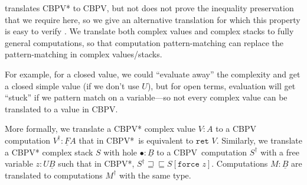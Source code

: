 \documentclass[acmsmall,screen,12pt]{acmart}
\newif\ifshort
\renewcommand{\u}{\underline}
\newcommand{\cbpv}{CBPV}
\newcommand{\cbpvstar}{CBPV*}
\newcommand{\pipe}{\,\,|\,\,}
\newcommand{\ltdyn}{\sqsubseteq}
\newcommand{\gtdyn}{\sqsupseteq}
\newcommand{\equidyn}{\mathrel{\gtdyn\ltdyn}}
\newcommand{\simp}[1]{{#1}^{\dag}}
\newcommand{\simpp}[1]{\simp{({#1})}}
\newcommand{\bindXtoYinZ}[2]{\kw{bind}#2 \leftarrow #1;}
\newcommand{\case}{\kw{case}}
\newcommand{\kw}[1]{\texttt{#1}\,\,}
\newcommand{\caseofXthenYelseZ}[3]{\case #1 \{ #2 \pipe #3 \}}
\newcommand{\ret}{\kw{ret}}
\newcommand{\force}{\kw{force}}
\begin{document}
\citet{levy03cbpvbook} translates \cbpvstar\/ to \cbpv, but not does not prove
the inequality preservation that we require here, so we give
an
alternative translation for which this property is easy to
verify \ifshort (see the extended version for full details)\fi.
We translate both complex values and complex
stacks to fully general computations, so that computation
pattern-matching can replace the pattern-matching in complex values/stacks.  
\begin{longonly}
For example, for a closed value, we could ``evaluate away''
the complexity and get a closed simple value (if we don't use $U$), but
for open terms, evaluation will get ``stuck'' if we pattern match on
a variable---so not every complex value can be translated to a value in
\cbpv.  
\end{longonly}
More formally, we translate a \cbpvstar\/ complex value $V : A$ to a
\cbpv\/ computation $\simp{V} : \u F A$ that in \cbpvstar\ is equivalent
to $\ret V$.
%
Similarly, we translate a \cbpvstar\/ complex stack $S$ with hole
$\bullet : \u B$ to a \cbpv\  computation $\simp{S}$ with a free
  variable $z : U \u B$ such that in \cbpvstar, $\simp S \equidyn
S[\force z]$.
%
Computations $M : \u B$ are translated to computations $\simp{M}$ with
the same type.
\end{document}
